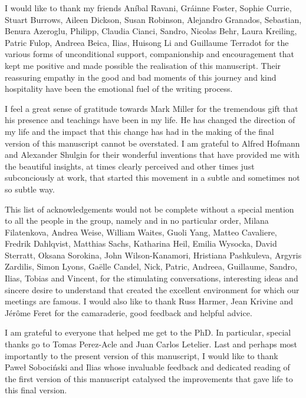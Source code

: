 \documentclass[phd,lfcs]{infthesis}
\begin{document}
\begin{preliminary}
\begin{acknowledgements}
  I would like to thank my friends
  An\'ibal Ravani, Gr\'ainne Foster,
  Sophie Currie, Stuart Burrows, Aileen Dickson, Susan Robinson,
  Alejandro Granados, Sebastian, Benura Azeroglu,
  Philipp, Claudia Cianci, Sandro,
  Nicolas Behr, Laura Kreiling,
  Patric Fulop, Andreea Beica,
  Ilias, Huisong Li and Guillaume Terradot
  for the various forms of unconditional support,
  companionship and encouragement
  that kept me positive and made possible
  the realisation of this manuscript.
  Their reassuring empathy
  in the good and bad moments of this journey
  and kind hospitality
  have been the emotional fuel of the writing process.

  \pagebreak

  I feel a great sense of gratitude towards
  Mark Miller for the tremendous gift
  that his presence and teachings
  have been in my life.
  He has changed the direction of my life
  and the impact that this change has had
  in the making of the final version of this manuscript
  cannot be overstated.
  I am grateful to Alfred Hofmann and Alexander Shulgin
  for their wonderful inventions that have provided me
  with the beautiful insights, %
  at times clearly perceived
  and other times just subconciously at work,
  that started this movement in a subtle
  and sometimes not so subtle way.

  This list of acknowledgements would not be complete
  without a special mention to all the people in the group,
  namely and in no particular order,
  Milana Filatenkova, Andrea Weise,
  William Waites, Guoli Yang, Matteo Cavaliere,
  Fredrik Dahlqvist, Matthias Sachs,
  Katharina Heil, Emilia Wysocka,
  David Sterratt, Oksana Sorokina, John Wilson-Kanamori,
  Hristiana Pashkuleva, Argyris Zardilis, Simon Lyons, Gaëlle Candel,
  Nick, Patric, Andreea, Guillaume, Sandro, Ilias, Tobias and Vincent,
  for the stimulating conversations, interesting ideas
  and sincere desire to understand
  that created the excellent environment
  for which our meetings are famous.
  I would also like to thank
  Russ Harmer, Jean Krivine and J\'er\^ome Feret
  for the camaraderie, good feedback and helpful advice.

  I am grateful to %
  everyone that helped me get to the PhD.
  In particular, special thanks go to Tomas Perez-Acle
  and Juan Carlos Letelier. %
  Last and perhaps most importantly
  to the present version of this manuscript,
  I would like to thank Paweł Sobociński and Ilias
  whose invaluable feedback and dedicated reading
  of the first version of this manuscript catalysed
  the improvements that gave life to this final version.


\end{acknowledgements}
\end{preliminary}
\end{document}
